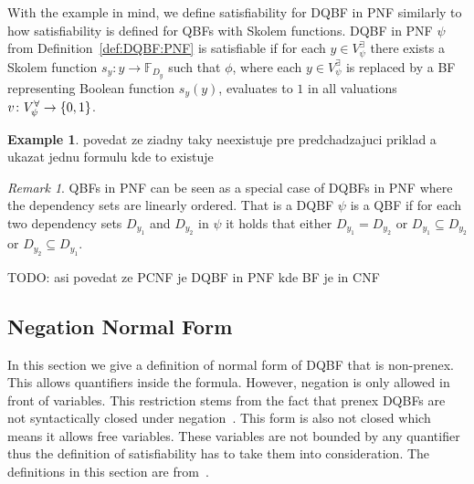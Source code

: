 \documentclass[
  digital, %
  twoside, %
  table,   %
  nolof,     %
  nolot,     %
]{fithesis3}
\let\setbuilder\set
\newcommand{\simpleset}[1]{\{{#1}\}}
\renewcommand{\set}[1]{\normalexpandarg\IfSubStr{#1}{|}{\setbuilder{#1}}{\simpleset{#1}}}
\theoremstyle{definition}
\newtheorem{example}{Example}
\theoremstyle{remark}
\newtheorem*{remark}{Remark}
\newcommand{\BFuncs}[1]{\mathbb{F}_{#1}}
\newcommand{\evars}[1]{V_{#1}^{\exists}}
\newcommand{\uvars}[1]{V_{#1}^{\forall}}
\begin{document}
With the example in mind, we define satisfiability for DQBF in PNF similarly to how satisfiability is defined for QBFs with Skolem functions. DQBF in PNF $\psi$ from Definition~\ref{def:DQBF:PNF} is satisfiable if for each $y \in \evars{\psi}$ there exists a Skolem function $s_y\colon y \to \BFuncs{D_y}$ such that $\phi$, where each $y \in \evars{\psi}$ is replaced by a BF representing Boolean function $s_y(y)$, evaluates to $1$ in all valuations $v\colon \uvars{\psi} \to \set{0,1}$.

\begin{example}
povedat ze ziadny taky neexistuje pre predchadzajuci priklad a ukazat jednu formulu kde to existuje
\end{example}

\begin{remark}
QBFs in PNF can be seen as a special case of DQBFs in PNF where the dependency sets are linearly ordered. That is a DQBF $\psi$ is a QBF if for each two dependency sets $D_{y_1}$ and $D_{y_2}$ in $\psi$ it holds that either $D_{y_1} = D_{y_2}$ or $D_{y_1} \subseteq D_{y_2}$ or $D_{y_2} \subseteq D_{y_1}$.
\end{remark}

TODO: asi povedat ze PCNF je DQBF in PNF kde BF je in CNF

\subsection{Negation Normal Form}

In this section we give a definition of normal form of DQBF that is non-prenex. This allows quantifiers inside the formula. However, negation is only allowed in front of variables. This restriction stems from the fact that prenex DQBFs are not syntactically closed under negation~\cite{NegationOfDQBFs}. %
This form is also not closed which means it allows free variables. These variables are not bounded by any quantifier thus the definition of satisfiability has to take them into consideration. The definitions in this section are from~\cite{HQSquantifierLocalization}.
\end{document}
